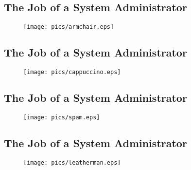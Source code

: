 \documentclass[xga]{xdvislides}
\begin{document}
\subsection{The Job of a System Administrator}
\vspace*{\fill}
\begin{figure}[hb]
	\begin{center}
		\texttt{[image: pics/armchair.eps]} \\
	\end{center}
\end{figure}
\vspace*{\fill}

\subsection{The Job of a System Administrator}
\vspace*{\fill}
\begin{figure}[hb]
	\begin{center}
		\texttt{[image: pics/cappuccino.eps]} \\
	\end{center}
\end{figure}
\vspace*{\fill}

\subsection{The Job of a System Administrator}
\vspace*{\fill}
\begin{figure}[hb]
	\begin{center}
		\texttt{[image: pics/spam.eps]} \\
	\end{center}
\end{figure}
\vspace*{\fill}

\subsection{The Job of a System Administrator}
\vspace*{\fill}
\begin{figure}[hb]
	\begin{center}
		\texttt{[image: pics/leatherman.eps]} \\
	\end{center}
\end{figure}
\vspace*{\fill}
\end{document}
